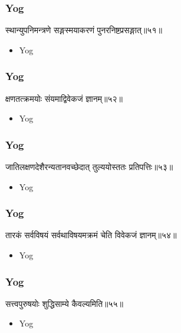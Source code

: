 \begin{frame}[fragile]\frametitle{Yog}
\begin{sanskrit}
स्थान्युपनिमन्त्रणे सङ्गस्मयाकरणं पुनरनिष्टप्रसङ्गात्॥५१॥
\end{sanskrit}
	\begin{itemize}
	\item Yog 
	\end{itemize}
\end{frame}

\begin{frame}[fragile]\frametitle{Yog}
\begin{sanskrit}
क्षणतत्क्रमयोः संयमाद्विवेकजं ज्ञानम्॥५२॥
\end{sanskrit}
	\begin{itemize}
	\item Yog 
	\end{itemize}
\end{frame}


\begin{frame}[fragile]\frametitle{Yog}
\begin{sanskrit}
जातिलक्षणदेशैरन्यतानवच्छेदात् तुल्ययोस्ततः प्रतिपत्तिः॥५३॥
\end{sanskrit}
	\begin{itemize}
	\item Yog 
	\end{itemize}
\end{frame}


\begin{frame}[fragile]\frametitle{Yog}
\begin{sanskrit}
तारकं सर्वविषयं सर्वथाविषयमक्रमं चेति विवेकजं ज्ञानम्॥५४॥
\end{sanskrit}
	\begin{itemize}
	\item Yog 
	\end{itemize}
\end{frame}

\begin{frame}[fragile]\frametitle{Yog}
\begin{sanskrit}
सत्त्वपुरुषयोः शुद्धिसाम्ये कैवल्यमिति॥५५॥
\end{sanskrit}
	\begin{itemize}
	\item Yog 
	\end{itemize}
\end{frame}

